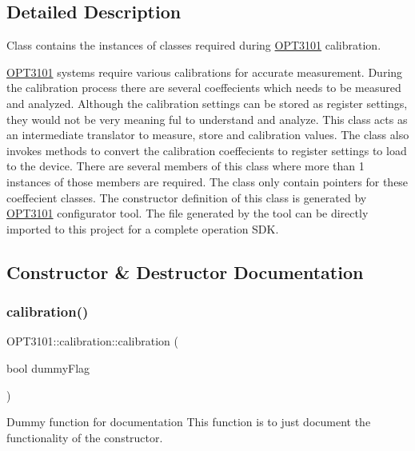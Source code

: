 \subsection{Detailed Description}
Class contains the instances of classes required during \mbox{\hyperlink{namespace_o_p_t3101}{O\+P\+T3101}} calibration. 

\mbox{\hyperlink{namespace_o_p_t3101}{O\+P\+T3101}} systems require various calibrations for accurate measurement. During the calibration process there are several coeffecients which needs to be measured and analyzed. Although the calibration settings can be stored as register settings, they would not be very meaning ful to understand and analyze. This class acts as an intermediate translator to measure, store and calibration values. The class also invokes methods to convert the calibration coeffecients to register settings to load to the device. There are several members of this class where more than 1 instances of those members are required. The class only contain pointers for these coeffecient classes. The constructor definition of this class is generated by \mbox{\hyperlink{namespace_o_p_t3101}{O\+P\+T3101}} configurator tool. The file generated by the tool can be directly imported to this project for a complete operation S\+DK. 

\subsection{Constructor \& Destructor Documentation}
\mbox{\label{class_o_p_t3101_1_1calibration_a152dc93111d392a23fdc53a0c739eb48}} 
\subsubsection{\texorpdfstring{calibration()}{calibration()}\hspace{0.1cm}{\footnotesize\ttfamily [1/2]}}
{\footnotesize\ttfamily O\+P\+T3101\+::calibration\+::calibration (\begin{DoxyParamCaption}\item[{bool}]{dummy\+Flag }\end{DoxyParamCaption})}



Dummy function for documentation This function is to just document the functionality of the constructor. 


